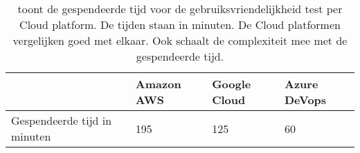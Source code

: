 \begin{table}[!htbp]
    \begin{tabular}{|l|l|l|l|}
        \hline
        & Amazon AWS & Google Cloud & Azure DeVops \\ \hline
        Gespendeerde tijd in minuten & 195 & 125 & 60 \\ \hline
    \end{tabular}
    \caption{toont de gespendeerde tijd voor de gebruiksvriendelijkheid test per Cloud platform. De tijden staan in minuten. De Cloud platformen vergelijken goed met elkaar. Ook schaalt de complexiteit mee met de gespendeerde tijd.}
    \label{tab:gebruiksvriendelijkheid}
\end{table}